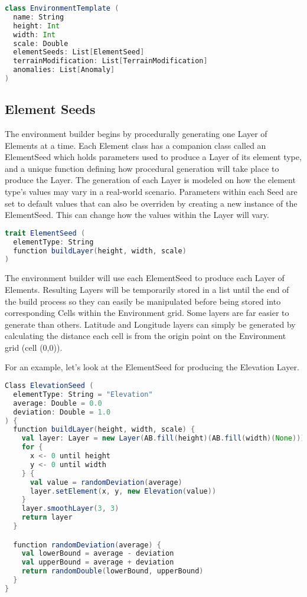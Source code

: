 \begin{lstlisting}[language=Scala]
class EnvironmentTemplate (
  name: String
  height: Int
  width: Int
  scale: Double
  elementSeeds: List[ElementSeed]
  terrainModification: List[TerrainModification]
  anomalies: List[Anomaly]
)
\end{lstlisting}


\subsection{Element Seeds}
The environment builder begins by procedurally generating one Layer of Elements at a time.
Each Element class has a companion class called an ElementSeed which holds parameters used to produce a Layer of its element type, and a unique function defining how procedural generation will take place to produce the Layer.
The generation of each Layer is modeled on how the element type's values may vary in a real-world scenario.
Parameters within each Seed are set to default values that can also be overriden by creating a new instance of the ElementSeed.
This can change how the values within the Layer will vary.

\begin{lstlisting}[language=Scala]
trait ElementSeed (
  elementType: String
  function buildLayer(height, width, scale)
)
\end{lstlisting}

The environment builder will use each ElementSeed to produce each Layer of Elements.
Resulting Layers will be temporarily stored in a list until the end of the build process so they can easily be manipulated before being stored into corresponding Cells within the Environment grid.
Some layers are far easier to generate than others.
Latitude and Longitude layers can simply be generated by calculating the distance each cell is from the origin point on the Environment grid (cell (0,0)).

For an example, let’s look at the ElementSeed for producing the Elevation Layer.

\begin{lstlisting}[language=Scala]
Class ElevationSeed (
  elementType: String = "Elevation"
  average: Double = 0.0
  deviation: Double = 1.0
) {
  function buildLayer(height, width, scale) {
    val layer: Layer = new Layer(AB.fill(height)(AB.fill(width)(None)))
    for {
      x <- 0 until height
      y <- 0 until width
    } {
      val value = randomDeviation(average)
      layer.setElement(x, y, new Elevation(value))
    }
    layer.smoothLayer(3, 3)
    return layer
  }

  function randomDeviation(average) {
    val lowerBound = average - deviation
    val upperBound = average + deviation
    return randomDouble(lowerBound, upperBound)
  }
}
\end{lstlisting}


